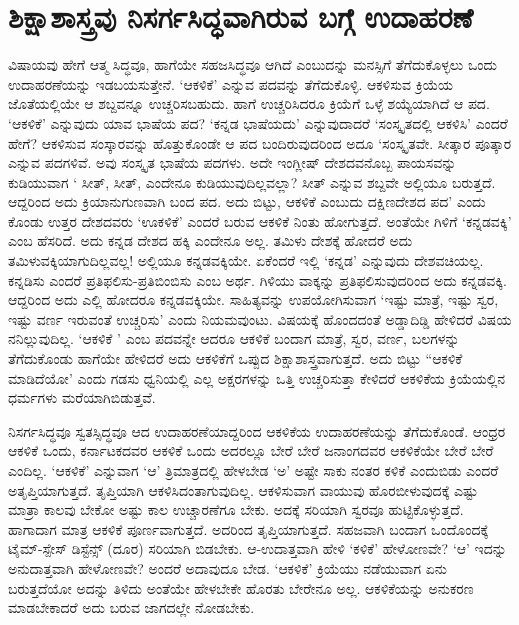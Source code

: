 \section*{ಶಿಕ್ಷಾಶಾಸ್ತ್ರವು  ನಿಸರ್ಗಸಿದ್ಧವಾಗಿರುವ ಬಗ್ಗೆ  ಉದಾಹರಣೆ}

ವಿಷಾಯವು ಹೇಗೆ ಆತ್ಮ ಸಿದ್ಧವೂ, ಹಾಗೆಯೇ ಸಹಜಸಿದ್ಧವೂ  ಆಗಿದೆ ಎಂಬುದನ್ನು  ಮನಸ್ಸಿಗೆ ತೆಗೆದುಕೊಳ್ಳಲು ಒಂದು ಉದಾಹರಣೆಯನ್ನು  ಇಡಬಯಸುತ್ತೇನೆ. `ಆಕಳಿಕೆ' ಎನ್ನುವ ಪದವನ್ನು  ತೆಗೆದುಕೊಳ್ಳಿ.  ಆಕಳಿಸುವ ಕ್ರಿಯೆಯ ಜೊತೆಯಲ್ಲಿಯೇ ಆ ಶಬ್ದವನ್ನೂ  ಉಚ್ಚರಿಸಬಹುದು. ಹಾಗೆ ಉಚ್ಚರಿಸಿದರೂ ಕ್ರಿಯೆಗೆ ಒಳ್ಳೆ  ಶಯ್ಯೆಯಾಗಿದೆ  ಆ ಪದ. `ಆಕಳಿಕೆ' ಎನ್ನುವುದು ಯಾವ ಭಾಷೆಯ ಪದ? `ಕನ್ನಡ ಭಾಷೆಯದು'  ಎನ್ನುವುದಾದರೆ `ಸಂಸ್ಕೃತದಲ್ಲಿ  ಆಕಳಿಸಿ' ಎಂದರೆ ಹೇಗೆ? ಆಕಳಿಸುವ  ಸಂಸ್ಕಾರವನ್ನು  ಹೊತ್ತುಕೊಂಡೇ ಆ ಪದ ಬಂದಿರುವುದರಿಂದ ಅದೂ `ಸಂಸ್ಕೃತವೇ. ಸೀತ್ಕಾರ ಪೂತ್ಕಾರ ಎನ್ನುವ ಪದಗಳಿವೆ. ಅವು ಸಂಸ್ಕೃತ  ಭಾಷೆಯ ಪದಗಳು. ಅದೇ ಇಂಗ್ಲೀಷ್  ದೇಶದವನೊಬ್ಬ ಪಾಯಸವನ್ನು  ಕುಡಿಯುವಾಗ ` ಸೀತ್, ಸೀತ್, ಎಂದೇನೂ ಕುಡಿಯುವುದಿಲ್ಲವಲ್ಲಾ? ಸೀತ್ ಎನ್ನುವ ಶಬ್ದವೇ ಅಲ್ಲಿಯೂ ಬರುತ್ತದೆ. ಆದ್ದರಿಂದ ಅದು ಕ್ರಿಯಾನುಗುಣವಾಗಿ ಬಂದ ಪದ. ಅದು ಬಿಟ್ಟು, ಆಕಳಿಕೆ  ಎಂಬುದು ದಕ್ಷಿಣದೇಶದ ಪದ' ಎಂದು ಕೊಂಡು  ಉತ್ತರ ದೇಶದವರು `ಊಕಳಿಕೆ' ಎಂದರೆ ಬರುವ ಆಕಳಿಕೆ  ನಿಂತು ಹೋಗುತ್ತದೆ. ಅಂತೆಯೇ ಗಿಳಿಗೆ  `ಕನ್ನಡವಕ್ಕಿ' ಎಂಬ ಹೆಸರಿದೆ. ಅದು ಕನ್ನಡ ದೇಶದ ಹಕ್ಕಿ ಎಂದೇನೂ ಅಲ್ಲ. ತಮಿಳು  ದೇಶಕ್ಕೆ ಹೋದರೆ ಅದು ತಮಿಳುವಕ್ಕಿಯಾಗುದಿಲ್ಲವಲ್ಲ! ಅಲ್ಲಿಯೂ ಕನ್ನಡವಕ್ಕಿಯೇ. ಏಕೆಂದರೆ ಇಲ್ಲಿ  `ಕನ್ನಡ' ಎನ್ನುವುದು ದೇಶವಚಿಯಲ್ಲ. ಕನ್ನಡಿಸು ಎಂದರೆ ಪ್ರತಿಫಲಿಸು-ಪ್ರತಿಬಿಂಬಿಸು ಎಂಬ ಅರ್ಥ. ಗಿಳಿಯು ವಾಕ್ಕನ್ನು  ಪ್ರತಿಫಲಿಸುವುದರಿಂದ ಅದು ಕನ್ನಡವಕ್ಕಿ. ಆದ್ದರಿಂದ ಅದು ಎಲ್ಲಿ ಹೋದರೂ ಕನ್ನಡವಕ್ಕಿಯೇ. ಸಾಹಿತ್ಯವನ್ನು ಉಪಯೋಗಿಸುವಾಗ `ಇಷ್ಟು ಮಾತ್ರೆ,  ಇಷ್ಟು ಸ್ವರ, ಇಷ್ಟು  ವರ್ಣ ಇರುವಂತೆ ಉಚ್ಚರಿಸು' ಎಂದು ನಿಯಮವುಂಟು. ವಿಷಯಕ್ಕೆ ಹೊಂದದಂತೆ ಅಡ್ಡಾದಿಡ್ಡಿ ಹೇಳಿದರೆ ವಿಷಯ ನನಿಲ್ಲುವುದಿಲ್ಲ.  `ಆಕಳಿಕೆ ' ಎಂಬ ಪದವನ್ನೇ ಆದರೂ ಆಕಳಿಕೆ  ಬಂದಾಗ ಮಾತ್ರೆ, ಸ್ವರ, ವರ್ಣ, ಬಲಗಳನ್ನು  ತೆಗೆದುಕೊಂಡು ಹಾಗೆಯೇ ಹೇಳಿದರೆ ಅದು ಆಕಳಿಕೆಗೆ ಒಪ್ಪುದ  ಶಿಕ್ಷಾಶಾಸ್ತ್ರವಾಗುತ್ತದೆ. ಅದು ಬಿಟ್ಟು  ``ಆಕಳಿಕೆ  ಮಾಡಿದೆಯೋ' ಎಂದು  ಗಡಸು ಧ್ವನಿಯಲ್ಲಿ  ಎಲ್ಲ  ಅಕ್ಷರಗಳನ್ನು  ಒತ್ತಿ  ಉಚ್ಚರಿಸುತ್ತಾ ಕೇಳಿದರೆ  ಆಕಳಿಕೆಯ ಕ್ರಿಯೆಯಲ್ಲಿನ  ಧರ್ಮಗಳು ಮರೆಯಾಗಿಬಿಡುತ್ತವೆ. 

ನಿಸರ್ಗಸಿದ್ಧವೂ ಸ್ವತಸ್ಸಿದ್ಧವೂ  ಆದ ಉದಾಹರಣೆಯಾದ್ದರಿಂದ ಆಕಳಿಕೆಯ ಉದಾಹರಣೆಯನ್ನು  ತೆಗೆದುಕೊಂಡೆ. ಆಂಧ್ರರ ಆಕಳಿಕೆ  ಒಂದು, ಕರ್ನಾಟಕದವರ ಆಕಳಿಕೆ ಒಂದು ಅದರಲ್ಲೂ ಬೇರೆ ಬೇರೆ ಜನಾಂಗದವರ  ಆಕಳಿಕೆಯೇ ಬೇರೆ ಬೇರೆ ಎಂದಿಲ್ಲ. `ಆಕಳಿಕೆ' ಎನ್ನುವಾಗ `ಆ' ತ್ರಿಮಾತ್ರದಲ್ಲಿ  ಹೇಳಬೇಡ `ಅ'  ಅಷ್ಟೇ ಸಾಕು ನಂತರ ಕಳಿಕೆ  ಎಂದುಬಿಡು  ಎಂದರೆ  ಅತೃಪ್ತಿಯಾಗುತ್ತದೆ. ತೃಪ್ತಿಯಾಗಿ ಆಕಳಿಸಿದಂತಾಗುವುದಿಲ್ಲ. ಆಕಳಿಸುವಾಗ ವಾಯುವು ಹೊರಬೀಳುವುದಕ್ಕೆ  ಎಷ್ಟು  ಮಾತ್ರಾ ಕಾಲವು  ಬೇಕೋ ಅಷ್ಟು  ಕಾಲ ಉಚ್ಚಾರಣೆಗೂ ಬೇಕು. ಅದಕ್ಕೆ   ಸರಿಯಾಗಿ  ಸ್ವರವೂ ಹುಟ್ಟಿಕೊಳ್ಳುತ್ತದೆ. ಹಾಗಾದಾಗ ಮಾತ್ರ  ಆಕಳಿಕೆ  ಪೂರ್ಣವಾಗುತ್ತದೆ. ಅದರಿಂದ ತೃಪ್ತಿಯಾಗುತ್ತದೆ. ಸಹಜವಾಗಿ ಬಂದಾಗ ಒಂದೊಂದಕ್ಕೆ  ಟೈಮ್-ಸ್ಪೇಸ್ ಡಿಸ್ಟೆನ್ಸ್  (ದೂರ) ಸರಿಯಾಗಿ ಬಿಡಬೇಕು. ಆ-ಉದಾತ್ತವಾಗಿ ಹೇಳಿ `ಕಳಿಕೆ' ಹೇಳೋಣವೇ?  `ಆ' ಇದನ್ನು  ಅನುದಾತ್ತವಾಗಿ ಹೇಳೋಣವೇ? ಅಂದರೆ ಅದಾವುದೂ ಬೇಡ. `ಆಕಳಿಕೆ' ಕ್ರಿಯೆಯು ನಡೆಯುವಾಗ ಏನು ಬರುತ್ತದೆಯೋ ಅದನ್ನು  ತಿಳಿದು ಅಂತೆಯೇ ಹೇಳಬೇಕೇ ಹೊರತು ಬೇರೇನೂ ಅಲ್ಲ. ಆಕಳಿಕೆಯನ್ನು  ಅನುಕರಣ ಮಾಡಬೇಕಾದರೆ ಅದು ಬರುವ ಜಾಗದಲ್ಲೇ ನೋಡಬೇಕು.

